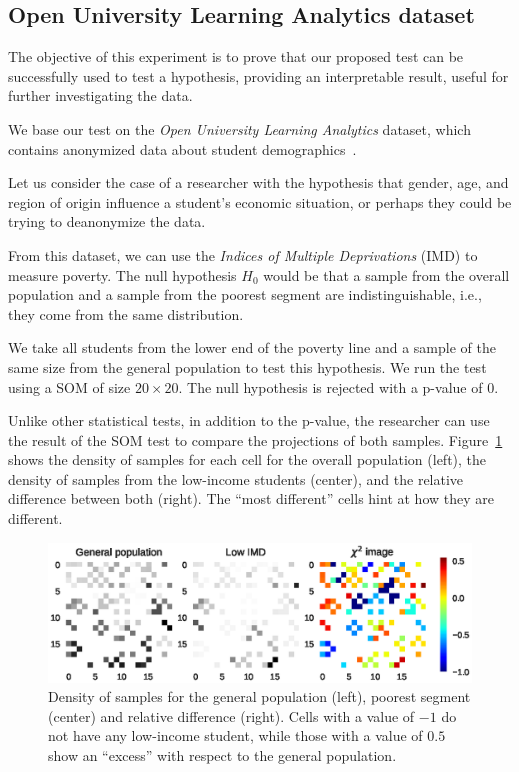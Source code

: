 \subsection{Open University Learning Analytics dataset}
\label{subsec:som_oulad}
The objective of this experiment is to prove that our proposed test can be successfully
used to test a hypothesis, providing an interpretable result, useful for further
investigating the data.

We base our test on the \emph{Open University Learning Analytics}
dataset, which contains anonymized data about student demographics~\cite{kuzilek_open_2017}.

Let us consider the case of a researcher with the hypothesis that gender, age, and
region of origin influence a student's economic situation, or perhaps they could
be trying to deanonymize the data.

From this dataset, we can use the \emph{Indices of Multiple Deprivations} (IMD) to measure poverty.
The null hypothesis $H_0$ would be that a sample from the overall population and a sample from
the poorest segment are indistinguishable, i.e., they come from the same distribution.

We take all students from the lower end of the poverty line and a sample of the same size
from the general population to test this hypothesis. We run the test using a SOM of size
$20\times20$. The null hypothesis is rejected with a p-value of $0$.

Unlike other statistical tests, in addition to the p-value, the researcher can use
the result of the SOM test to compare the projections of both samples.
Figure~\ref{fig:oulad_grid} shows the density of samples for each cell for the overall population
(left), the density of samples from the low-income students (center), and the relative difference
between both (right). The ``most different'' cells hint at how they are different.

\begin{figure}[t]
    \centering
    \includegraphics[width=\textwidth]{images/4_som/imd.eps}
    \caption{Density of samples for the general population (left), poorest segment (center) and
    relative difference (right). Cells with a value of $-1$ do not have any low-income student,
    while those with a value of $0.5$ show an ``excess'' with respect to the general
    population.}
    \label{fig:oulad_grid}
\end{figure}

